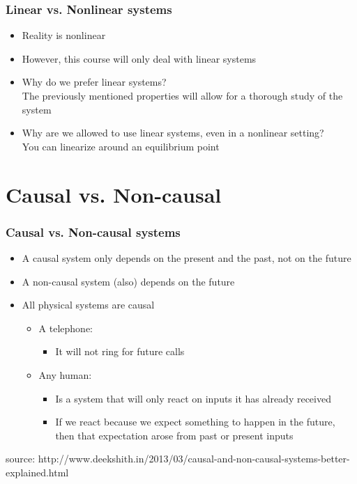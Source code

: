 \documentclass{beamer}
\begin{document}

\begin{frame}
\frametitle{Linear vs. Nonlinear systems}
\vspace{-6ex}
\begin{itemize}
\item Reality is nonlinear
\item However, this course will only deal with linear systems
\item Why do we prefer linear systems? \\
\medskip
The previously mentioned properties will allow for a thorough study of the system
\item Why are we allowed to use linear systems, even in a nonlinear setting?\\
\medskip
You can linearize around an equilibrium point
\end{itemize}
\end{frame}

\section{Causal vs. Non-causal} 

\begin{frame}
\frametitle{Causal vs. Non-causal systems}
\begin{itemize}
\item \normalsize{A causal system only depends on the present and the past, not on the future}
\item \normalsize{A non-causal system (also) depends on the future}
\item \normalsize{All physical systems are causal}
\begin{itemize}
\item \normalsize{A telephone:}
\begin{itemize}
\item \normalsize{It will not ring for future calls}
\end{itemize}
\item \normalsize{Any human:} 
\begin{itemize}
\item \normalsize{Is a system that will only react on inputs it has already received}
\item \normalsize{If we react because we expect something to happen in the future, then that expectation arose from past or present inputs}
\end{itemize}
\end{itemize}
\end{itemize}
\bigskip
\footnotesize{source: http://www.deekshith.in/2013/03/causal-and-non-causal-systems-better-explained.html}
\end{frame}
\end{document}
